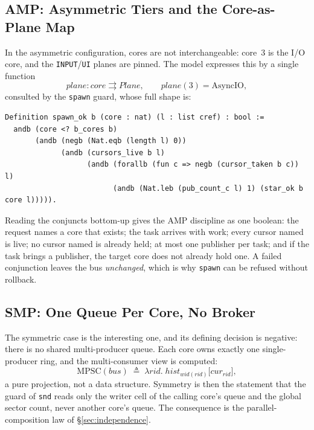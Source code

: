 \documentclass[10pt,journal,compsoc,twocolumn]{article}
\theoremstyle{definition}
\theoremstyle{remark}
\theoremstyle{plain}
\newcommand{\ctr}[1]{\texttt{#1}}
\begin{document}
\subsection{AMP: Asymmetric Tiers and the Core-as-Plane Map}
In the asymmetric configuration, cores are not interchangeable: core~3 is the I/O core, and the \ctr{INPUT}/\ctr{UI} planes are pinned. The model expresses this by a single function
\begin{equation}
\mathit{plane} : \mathit{core} \rightrightarrows \mathit{Plane}, \qquad \mathit{plane}(3) = \mathrm{AsyncIO},
\end{equation}
consulted by the \ctr{spawn} guard, whose full shape is:
\begin{lstlisting}[language=Coq]
Definition spawn_ok b (core : nat) (l : list cref) : bool :=
  andb (core <? b_cores b)
       (andb (negb (Nat.eqb (length l) 0))
             (andb (cursors_live b l)
                   (andb (forallb (fun c => negb (cursor_taken b c)) l)
                         (andb (Nat.leb (pub_count_c l) 1) (star_ok b core l))))).
\end{lstlisting}
Reading the conjuncts bottom-up gives the AMP discipline as one boolean: the request names a core that exists; the task arrives with work; every cursor named is live; no cursor named is already held; at most one publisher per task; and if the task brings a publisher, the target core does not already hold one. A failed conjunction leaves the bus \emph{unchanged}, which is why \ctr{spawn} can be refused without rollback.

\subsection{SMP: One Queue Per Core, No Broker}
\label{sec:smp}
The symmetric case is the interesting one, and its defining decision is negative: there is no shared multi-producer queue. Each core owns exactly one single-producer ring, and the multi-consumer view is computed:
\begin{equation}
\label{eq:mpsc-free}
\mathrm{MPSC}(\mathit{bus}) \;\triangleq\; \lambda \mathit{rid}.\; \mathit{hist}_{\mathit{wid}(\mathit{rid})}\big[\mathit{cur}_{\mathit{rid}}\big],
\end{equation}
a pure projection, not a data structure. Symmetry is then the statement that the guard of \ctr{snd} reads only the writer cell of the calling core's queue and the global sector count, never another core's queue. The consequence is the parallel-composition law of \S\ref{sec:independence}.
\end{document}
